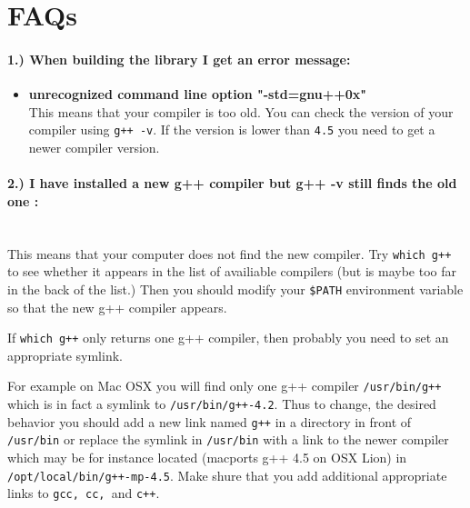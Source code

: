 \section{FAQs}
\paragraph{1.) When building the library I get an error message:}
\begin{itemize}
\item {\bf unrecognized command line option "-std=gnu++0x"}\\
  This means that your compiler is too old. You can check the 
  version of your compiler using \texttt{g++ -v}. If the version is lower than
  \texttt{4.5} you need to get a newer compiler version.
\end{itemize}

\paragraph{2.) I have installed a new g++ compiler but g++ -v still finds the old one :}
\ \\
  This means that your computer does not find the new compiler. Try
  \texttt{which g++} to see whether it appears in the list of availiable 
  compilers (but is maybe too far in the back of the list.) Then you should 
  modify your \texttt{\$PATH} environment variable so that the new g++ compiler
  appears.

  If \texttt{which g++} only returns one g++ compiler, then probably you need to
  set an appropriate symlink.
  
  For example on Mac OSX you will find only one g++ compiler \texttt{/usr/bin/g++}
  which is in fact a symlink to \texttt{/usr/bin/g++-4.2}. Thus to change, the 
  desired behavior you should add a new link named \texttt{g++} in a directory 
  in front of \texttt{/usr/bin} or replace the symlink in \texttt{/usr/bin}
  with a link to the newer compiler which may be for instance located (macports 
  g++ 4.5 on OSX Lion) in \texttt{/opt/local/bin/g++-mp-4.5}. Make shure that 
  you add additional appropriate links to \texttt{gcc, cc, }and \texttt{c++}.

